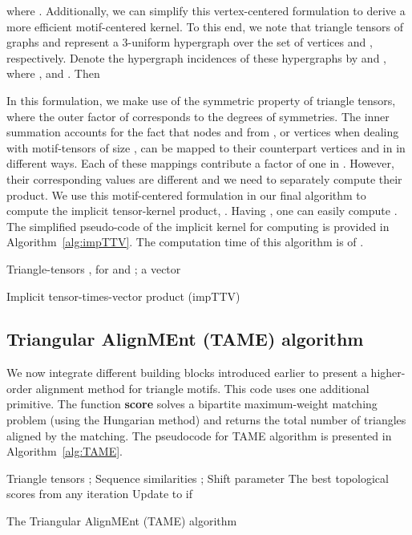 \documentclass[10pt, journal, compsoc, final]{IEEEtran}
\begin{document}
where . Additionally, we can simplify this 
vertex-centered formulation to derive a more efficient motif-centered kernel. To this end, we note 
that triangle tensors of graphs  and  represent a 3-uniform hypergraph over 
the set of vertices  and , respectively. Denote the hypergraph incidences of 
these hypergraphs by  and , 
where , and . Then

In this formulation, we make use of the symmetric property of triangle tensors, where the outer 
factor of  corresponds to the  degrees of symmetries. The inner summation accounts for the fact that nodes  and  from , or vertices  when dealing with motif-tensors of 
size , can be mapped to their counterpart vertices  and  in  in 
 different ways. Each of these mappings contribute a factor of one in 
. However, their corresponding  values are 
different and we need to separately compute their product. We use this motif-centered formulation 
in our final algorithm to compute the implicit tensor-kernel product, . Having , one can easily 
compute . 
The simplified pseudo-code of the implicit kernel for computing  is provided in Algorithm~\ref{alg:impTTV}. The computation time of this algorithm is of .

\begin{algorithm}
\centering
\begin{algorithmic}[1]
\REQUIRE  Triangle-tensors ,  for  and ; a vector 
\ENSURE 
\STATE 
\STATE 
\FOR{}
	\FOR{}
		\FOR{}
			\FOR{}		
				\STATE 		
			\ENDFOR
		\ENDFOR
		\STATE 
	\ENDFOR
\ENDFOR
\STATE 
\end{algorithmic}
\caption{Implicit tensor-times-vector product (impTTV)}
\label{alg:impTTV}
\end{algorithm}



\subsection{Triangular AlignMEnt (TAME) algorithm}
\label{sec:TAME_alg}

We now integrate different building blocks introduced earlier to present a 
higher-order alignment method for triangle motifs. This code uses
one additional primitive. The function \textbf{score} solves a
bipartite maximum-weight matching problem (using the Hungarian
method) and returns the total number of 
triangles  aligned by the matching. The pseudocode for TAME 
algorithm is presented in Algorithm~\ref{alg:TAME}. 

\begin{algorithm}
\centering
\begin{algorithmic}[1]
\REQUIRE Triangle tensors ;   Sequence similarities ; Shift parameter 
\ENSURE The best topological scores  from any iteration
\STATE  {}
\STATE 
\STATE 
\STATE 
\REPEAT
\STATE  
\STATE 
\STATE  
\STATE 
\STATE 
\STATE 
\STATE Update  to  if 
\STATE 
{}
\RETURN 

\end{algorithmic}
\caption{The Triangular AlignMEnt (TAME) algorithm}
\label{alg:TAME}
\end{algorithm}
\end{document}
